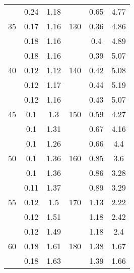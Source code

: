 \begin{table}[H]
\begin{tabular}{S[table-format = 2.0] S S S[table-format = 2.0] S S}
		                 & 0.24          & 1.18          &                  & 0.65          & 4.77          \\
		35               & 0.17          & 1.16          & 130              & 0.36          & 4.86          \\
		                 & 0.18          & 1.16          &                  & 0.4           & 4.89          \\
		                 & 0.18          & 1.16          &                  & 0.39          & 5.07          \\
		40               & 0.12          & 1.12          & 140              & 0.42          & 5.08          \\
		                 & 0.12          & 1.17          &                  & 0.44          & 5.19          \\
		                 & 0.12          & 1.16          &                  & 0.43          & 5.07          \\
		45               & 0.1           & 1.3           & 150              & 0.59          & 4.27          \\
		                 & 0.1           & 1.31          &                  & 0.67          & 4.16          \\
		                 & 0.1           & 1.26          &                  & 0.66          & 4.4           \\
		50               & 0.1           & 1.36          & 160              & 0.85          & 3.6           \\
		                 & 0.1           & 1.36          &                  & 0.86          & 3.28          \\
		                 & 0.11          & 1.37          &                  & 0.89          & 3.29          \\
		55               & 0.12          & 1.5           & 170              & 1.13          & 2.22          \\
		                 & 0.12          & 1.51          &                  & 1.18          & 2.42          \\
		                 & 0.12          & 1.49          &                  & 1.18          & 2.4           \\
		60               & 0.18          & 1.61          & 180              & 1.38          & 1.67          \\
		                 & 0.18          & 1.63          &                  & 1.39          & 1.66          \\

\end{tabular}
\end{table}
